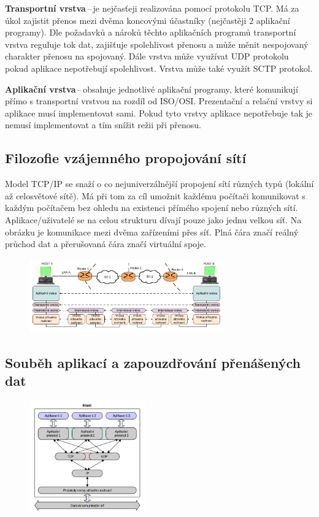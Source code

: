 \textbf{Transportní vrstva}\,--\,je nejčasťeji realizována pomocí protokolu TCP. Má za úkol zajistit přenos mezi dvěma koncovými účastníky (nejčastěji 2 aplikační programy).
Dle požadavků a nároků těchto aplikačních programů transportní vrstva reguluje tok dat, zajišťuje spolehlivost přenosu a může měnit nespojovaný charakter přenosu na spojovaný.
Dále vrstva může využívat UDP protokolu pokud aplikace nepotřebují spolehlivost.
Vrstva může také využít SCTP protokol.

\textbf{Aplikační vrstva}\,--\,obsahuje jednotlivé aplikační programy, které komunikují přímo s transportní vrstvou na rozdíl od ISO/OSI.
Prezentační a relační vrstvy si aplikace musí implementovat sami.
Pokud tyto vrstvy aplikace nepotřebuje tak je nemusí implementovat a tím snížit režii při přenosu.

\subsection{Filozofie vzájemného propojování sítí}

Model TCP/IP se snaží o co nejuniverzálnější propojení sítí různých typů (lokální až celosvětové sítě).
Má při tom za cíl umožnit každému počítači komunikovat s každým počítačem bez ohledu na existenci přímého spojení nebo různých sítí.
Aplikace/uživatelé se na celou strukturu dívají pouze jako jednu velkou síť.
Na obrázku je komunikace mezi dvěma zařízeními přes síť.
Plná čára značí reálný průchod dat a přerušovaná čára značí virtuální spoje.

\begin{figure}[!h]
    \centering
    \includegraphics[width=0.75\textwidth]{obrazky/011.png}
\end{figure}

\subsection{Souběh aplikací a zapouzdřování přenášených dat}

\begin{figure}[!h]
    \centering
    \includegraphics[width=0.45\textwidth]{obrazky/012.png}
\end{figure}

